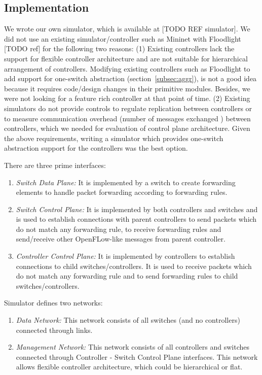 \documentclass[10pt, twocolumn]{article}
\begin{document}
\subsection{Implementation}
\label{sec:implementation}
We wrote our own simulator, which is available at [TODO REF simulator]. We did not use an existing simulator/controller such as Mininet with Floodlight [TODO ref] for the following two reasons: (1) Existing controllers lack the support for flexible controller architecture and are not suitable for hierarchical arrangement of controllers. Modifying existing controllers such as Floodlight to add support for one-switch abstraction (section~\ref{subsec:aggr}), is not a good idea because it requires code/design changes in their primitive modules. Besides, we were not looking for a feature rich controller at that point of time. (2) Existing simulators do not provide controls to regulate replication between controllers or to measure communication overhead (number of messages exchanged ) between controllers, which we needed for evaluation of control plane architecture. Given the above requirements, writing a simulator which provides one-switch abstraction support for the controllers was the best option.

There are three prime interfaces:
\begin{enumerate}
    \item {\it Switch Data Plane:} It is implemented by a switch to create forwarding elements to handle packet forwarding according to forwarding rules.
    \item {\it Switch Control Plane:} It is implemented by both controllers and switches and is used to establish connections with parent controllers to send packets which do not match any forwarding rule, to receive forwarding rules and send/receive other OpenFLow-like messages from parent controller.
    \item {\it Controller Control Plane:} It is implemented by controllers to establish connections to child switches/controllers. It is used to receive packets which do not match any forwarding rule and to send forwarding rules to child switches/controllers.
\end{enumerate}
Simulator defines two networks:
\begin{enumerate}
    \item {\it Data Network:} This network consists of all switches (and no controllers) connected through links.
    \item {\it Management Network:} This network consists of all controllers and switches connected through Controller - Switch Control Plane interfaces. This network allows flexible controller architecture, which could be hierarchical or flat.
\end{enumerate}
\end{document}
